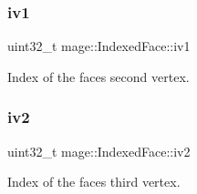 \subsubsection{\texorpdfstring{iv1}{iv1}}
{\footnotesize\ttfamily uint32\+\_\+t mage\+::\+Indexed\+Face\+::iv1}

Index of the face\textquotesingle{}s second vertex. \hypertarget{structmage_1_1_indexed_face_a343e5f22f65e3721b440cc6cbea50014}{}\label{structmage_1_1_indexed_face_a343e5f22f65e3721b440cc6cbea50014} 
\subsubsection{\texorpdfstring{iv2}{iv2}}
{\footnotesize\ttfamily uint32\+\_\+t mage\+::\+Indexed\+Face\+::iv2}

Index of the face\textquotesingle{}s third vertex. 